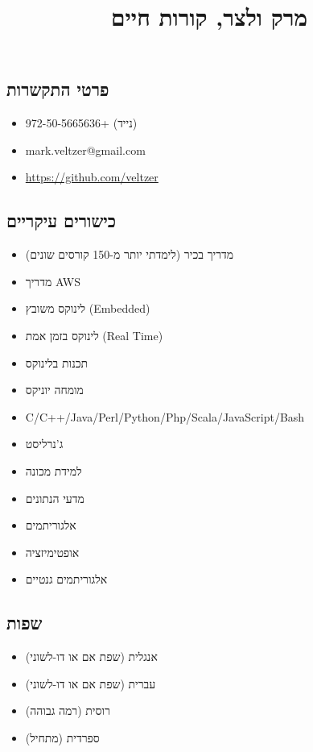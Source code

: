 \documentclass[
  hebrew,
]{article}
\title{מרק ולצר, קורות חיים}
\author{}
\date{}
\providecommand{\tightlist}{%
  \setlength{\itemsep}{0pt}\setlength{\parskip}{0pt}}
\begin{document}
\maketitle

\subsection{פרטי
התקשרות}\label{ux5e4ux5e8ux5d8ux5d9-ux5d4ux5eaux5e7ux5e9ux5e8ux5d5ux5ea}

\begin{itemize}
\tightlist
\item
  972-50-5665636+ (נייד)
\item
  mark.veltzer@gmail.com
\item
  \url{https://github.com/veltzer}
\end{itemize}

\subsection{כישורים
עיקריים}\label{ux5dbux5d9ux5e9ux5d5ux5e8ux5d9ux5dd-ux5e2ux5d9ux5e7ux5e8ux5d9ux5d9ux5dd}

\begin{itemize}
\tightlist
\item
  מדריך בכיר (לימדתי יותר מ-150 קורסים שונים)
\item
  מדריך AWS
\item
  לינוקס משובץ (Embedded)
\item
  לינוקס בזמן אמת (Real Time)
\item
  תכנות בלינוקס
\item
  מומחה יוניקס
\item
  C/C++/Java/Perl/Python/Php/Scala/JavaScript/Bash
\item
  ג'נרליסט
\item
  למידת מכונה
\item
  מדעי הנתונים
\item
  אלגוריתמים
\item
  אופטימיזציה
\item
  אלגוריתמים גנטיים
\end{itemize}

\subsection{שפות}\label{ux5e9ux5e4ux5d5ux5ea}

\begin{itemize}
\tightlist
\item
  אנגלית (שפת אם או דו-לשוני)
\item
  עברית (שפת אם או דו-לשוני)
\item
  רוסית (רמה גבוהה)
\item
  ספרדית (מתחיל)
\end{itemize}
\end{document}
